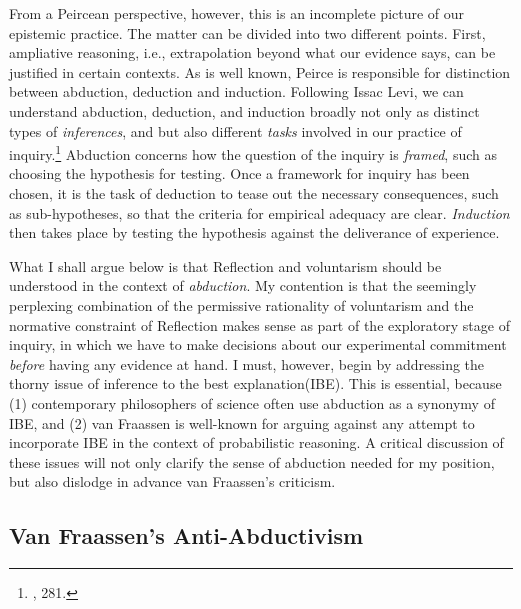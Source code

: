From a Peircean perspective, however, this is an incomplete picture of
our epistemic practice. The matter can be divided into two different
points. First, ampliative reasoning, i.e., extrapolation beyond what our
evidence says, can be justified in certain contexts. As is well known,
Peirce is responsible for distinction between abduction, deduction and
induction. Following Issac Levi, we can understand abduction, deduction,
and induction broadly not only as distinct types of \emph{inferences},
and but also different \emph{tasks} involved in our practice of
inquiry.\footnote{\cite{levibeware}, 281.} Abduction concerns how the question of the inquiry
is \emph{framed}, such as choosing the hypothesis for testing. Once a
framework for inquiry has been chosen, it is the task of deduction to
tease out the necessary consequences, such as sub-hypotheses, so that
the criteria for empirical adequacy are clear. \emph{Induction} then
takes place by testing the hypothesis against the deliverance of
experience.

What I shall argue below is that Reflection and voluntarism should be
understood in the context of \emph{abduction}. My contention is that the
seemingly perplexing combination of the permissive rationality of
voluntarism and the normative constraint of Reflection makes sense as
part of the exploratory stage of inquiry, in which we have to make
decisions about our experimental commitment \emph{before} having any
evidence at hand. I must, however, begin by addressing the thorny issue
of inference to the best explanation(IBE). This is essential, because
(1) contemporary philosophers of science often use abduction as a
synonymy of IBE, and (2) van Fraassen is well-known for arguing against
any attempt to incorporate IBE in the context of probabilistic
reasoning. A critical discussion of these issues will not only clarify
the sense of abduction needed for my position, but also dislodge in
advance van Fraassen's criticism.

\hypertarget{van-fraassens-anti-abductivism}{%
\subsection{Van Fraassen's
Anti-Abductivism}\label{van-fraassens-anti-abductivism}}

